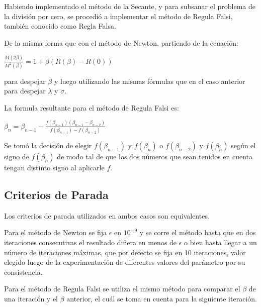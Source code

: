 Habiendo implementado el m\'etodo de la Secante, y para subsanar el problema de la divisi\'on por cero, se procedi\'o a implementar el m\'etodo de Regula Falsi, tambi\'en conocido como Regla Falsa.

De la misma forma que con el m\'etodo de Newton, partiendo de la ecuaci\'on:

$\frac{M(2\beta)}{M^2(\beta)}=1 + \beta(R(\beta)-R(0))$

para despejar $\beta$ y luego utilizando las mismas f\'ormulas que en el caso anterior para despejar $\lambda$ y $\sigma$.

La formula resultante para el m\'etodo de Regula Falsi es:

$\beta_n = \beta_{n-1} - \frac{f(\beta_{n-1}) (\beta_{n-1}-\beta_{n-2})}{f(\beta_{n-1}) - f(\beta_{n-2})}$

Se tom\'o la decisi\'on de elegir $f(\beta_{n-1})$ y $f(\beta_n)$ o $f(\beta_{n-2})$ y $f(\beta_n)$ seg\'un el signo de $f(\beta_n)$ de modo tal de que los dos n\'umeros que sean tenidos en cuenta tengan distinto signo al aplicarle $f$.

\subsection{Criterios de Parada}

Los criterios de parada utilizados en ambos casos son equivalentes.

Para el m\'etodo de Newton se fija $\epsilon$ en $10^{-9}$ y se corre el m\'etodo hasta que en dos iteraciones consecutivas el resultado difiera en menos de $\epsilon$ o bien hasta llegar a un n\'umero de iteraciones m\'aximas, que por defecto se fija en 10 iteraciones, valor elegido luego de la experimentaci\'on de diferentes valores del par\'ametro por su consistencia.

Para el m\'etodo de Regula Falsi se utiliza el mismo m\'etodo para comparar el $\beta$ de una iteraci\'on y el $\beta$ anterior, el cu\'al se toma en cuenta para la siguiente iteraci\'on.
